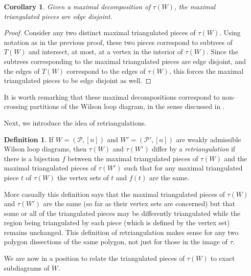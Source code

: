 \documentclass[11pt]{article}
\newcommand{\cP}{\mathcal{P}}
\newtheorem{cor}[thm]{Corollary}
\theoremstyle{remark}
\theoremstyle{definition}
\newtheorem{dfn}[thm]{Definition}
\begin{document}
\begin{cor} \label{maxtriangdisjointcor}
Given a maximal decomposition of $\tau(W)$, the maximal triangulated pieces are edge disjoint.
\end{cor}

\begin{proof}
Consider any two distinct maximal triangulated pieces of $\tau(W)$. Using notation as in the previous proof, these two pieces correspond to subtrees of $T(W)$ and intersect, at most, at a vertex in the interior of $\tau(W)$. Since the subtrees corresponding to the maximal triangulated pieces are edge disjoint, and the edges of $T(W)$ correspond to the edges of $\tau(W)$, this forces the maximal triangulated pieces to be edge disjoint as well.
\end{proof}

It is worth remarking that these maximal decompositions correspond to non-crossing partitions of the Wilson loop diagram, in the sense discussed in \cite{positroids13}. 

Next, we introduce the idea of retriangulations. 
\begin{dfn} \label{retriangulation}
  If $W = (\cP, [n])$ and $W' = (\cP', [n])$ are weakly admissible Wilson loop diagrams, then $\tau(W)$ and $\tau(W')$  differ by a \emph{retriangulation} if there is a bijection $f$ between the maximal triangulated pieces of $\tau(W)$ and the maximal triangulated pieces of $\tau(W')$ such that for any maximal triangulated piece $t$ of $\tau(W)$ the vertex sets of $t$ and $f(t)$ are the same.
\end{dfn}
More casually this definition says that the maximal triangulated pieces of $\tau(W)$ and $\tau(W')$ are the same (so far as their vertex sets are concerned) but that some or all of the triangulated pieces may be differently triangulated while the region being triangulated by each piece (which is defined by the vertex set) remains unchanged. This definition of retriangulation makes sense for any two polygon dissections of the same polygon, not just for those in the image of $\tau$. 
   
We are now in a position to relate the triangulated pieces of $\tau(W)$ to exact subdiagrams of $W$.
\end{document}
